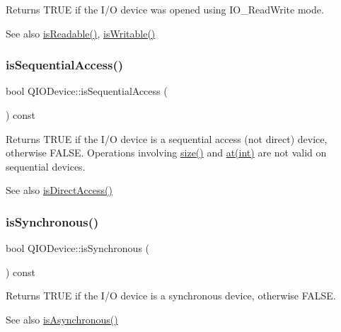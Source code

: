 Returns T\+R\+UE if the I/O device was opened using {\ttfamily I\+O\+\_\+\+Read\+Write} mode. \begin{DoxySeeAlso}{See also}
\mbox{\hyperlink{class_q_i_o_device_a3bba4665b92eabfeca6905e7561cc943}{is\+Readable()}}, \mbox{\hyperlink{class_q_i_o_device_ab033a6ee76263214267daf8b62ade3c7}{is\+Writable()}} 
\end{DoxySeeAlso}
\mbox{\label{class_q_i_o_device_ab0c6f50325bbf1e860aed41f3bfa498c}} 
\subsubsection{\texorpdfstring{isSequentialAccess()}{isSequentialAccess()}}
{\footnotesize\ttfamily bool Q\+I\+O\+Device\+::is\+Sequential\+Access (\begin{DoxyParamCaption}{ }\end{DoxyParamCaption}) const\hspace{0.3cm}{\ttfamily [inline]}}

Returns T\+R\+UE if the I/O device is a sequential access (not direct) device, otherwise F\+A\+L\+SE. Operations involving \mbox{\hyperlink{class_q_i_o_device_a60c4146763625213ac7aa29f1f071592}{size()}} and \mbox{\hyperlink{class_q_i_o_device_a14643fc1c2e05c2addd1ecc03bd98017}{at(int)}} are not valid on sequential devices. \begin{DoxySeeAlso}{See also}
\mbox{\hyperlink{class_q_i_o_device_ace782017b9a264d7d1759223add28ae7}{is\+Direct\+Access()}} 
\end{DoxySeeAlso}
\mbox{\label{class_q_i_o_device_ac425c50bec523a8f6bccfbe2c1934f19}} 
\subsubsection{\texorpdfstring{isSynchronous()}{isSynchronous()}}
{\footnotesize\ttfamily bool Q\+I\+O\+Device\+::is\+Synchronous (\begin{DoxyParamCaption}{ }\end{DoxyParamCaption}) const\hspace{0.3cm}{\ttfamily [inline]}}

Returns T\+R\+UE if the I/O device is a synchronous device, otherwise F\+A\+L\+SE. \begin{DoxySeeAlso}{See also}
\mbox{\hyperlink{class_q_i_o_device_a95291c3aa671e64d41e4320190f05f4e}{is\+Asynchronous()}} 
\end{DoxySeeAlso}
\mbox{\label{class_q_i_o_device_abf1df3cc1e0734c784c9d8eff82908c0}} 
